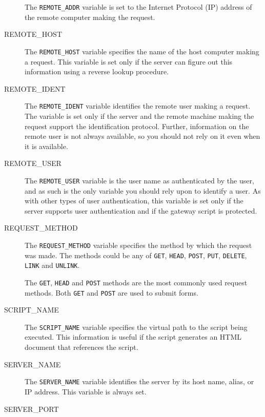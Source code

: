 \begin{description}
The \verb|REMOTE_ADDR| variable is set to the Internet Protocol (IP) address
of the remote computer making the request. 

\item[REMOTE\_HOST]

The \verb|REMOTE_HOST| variable specifies the name of the host computer making a
request. This variable is set only if the server can figure out this
information using a reverse lookup procedure. 

\item[REMOTE\_IDENT]

The \verb|REMOTE_IDENT| variable identifies the remote user making a request. The
variable is set only if the server and the remote machine making the
request support the identification protocol. Further, information on the
remote user is not always available, so you should not rely on it even
when it is available. 

\item[REMOTE\_USER]

The \verb|REMOTE_USER| variable is the user name as authenticated by the user,
and as such is the only variable you should rely upon to identify a user.
As with other types of user authentication, this variable is set only if
the server supports user authentication and if the gateway script is
protected. 

\item[REQUEST\_METHOD]

The \verb|REQUEST_METHOD| variable specifies the method by which the request
was made. The methods could be any of \verb|GET|, \verb|HEAD|, \verb|POST|,
\verb|PUT|, \verb|DELETE|, \verb|LINK| and  \verb|UNLINK|.

The \verb|GET|, \verb|HEAD| and \verb|POST| methods are the most commonly
used request methods. Both \verb|GET| and \verb|POST| are used to submit forms. 

\item[SCRIPT\_NAME]

The \verb|SCRIPT_NAME| variable specifies the virtual path to the script being
executed. This information is useful if the script generates an HTML document
that references the script.

\item[SERVER\_NAME]

The \verb|SERVER_NAME| variable identifies the server by its host name, alias,
or IP address. This variable is always set.

\item[SERVER\_PORT]


\end{description}
